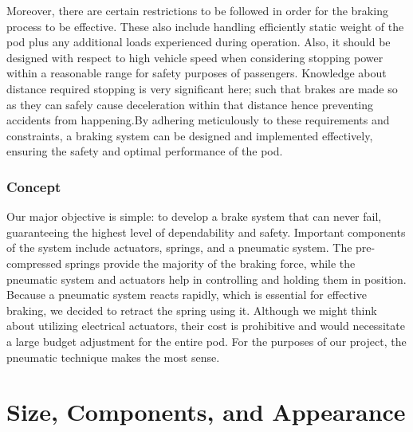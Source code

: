 Moreover, there are certain restrictions to be followed in order for the braking process to be effective. These also include handling efficiently static weight of the pod plus any additional loads experienced during operation. Also, it should be designed with respect to high vehicle speed when considering stopping power within a reasonable range for safety purposes of passengers. Knowledge about distance required stopping is very significant here; such that brakes are made so as they can safely cause deceleration within that distance hence preventing accidents from happening.By adhering meticulously to these requirements and constraints, a braking system can be designed and implemented effectively, ensuring the safety and optimal performance of the pod.

\subsubsection{Concept}
Our major objective is simple: to develop a brake system that can never fail, guaranteeing the highest level of dependability and safety. Important components of the system include actuators, springs, and a pneumatic system. The pre-compressed springs provide the majority of the braking force, while the pneumatic system and actuators help in controlling and holding them in position.
Because a pneumatic system reacts rapidly, which is essential for effective braking, we decided to retract the spring using it. Although we might think about utilizing electrical actuators, their cost is prohibitive and would necessitate a large budget adjustment for the entire pod. For the purposes of our project, the pneumatic technique makes the most sense.





\section{Size, Components, and Appearance}


